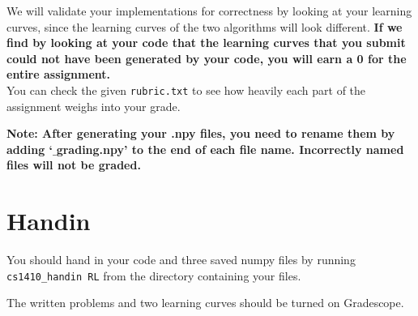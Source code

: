 \documentclass[12pt]{article}
\begin{document}
We will validate your implementations for correctness by looking at your learning curves, since the learning curves of the two algorithms will look different.
\textbf{If we find by looking at your code that the learning curves that you submit could not have been generated by your code, you will earn a 0 for the entire assignment.} ~\\

You can check the given \verb|rubric.txt| to see how heavily each part of the assignment weighs into your grade.

\textbf{
Note: After generating your .npy files, you need to rename them by adding `$\_$grading.npy' to the end of each file name. Incorrectly named files will not be graded.}

\section{Handin}
You should hand in your code and three saved numpy files by running \texttt{cs1410\_handin RL} from the directory containing your files.

The written problems and two learning curves should be turned on Gradescope. ~\\
\end{document}
